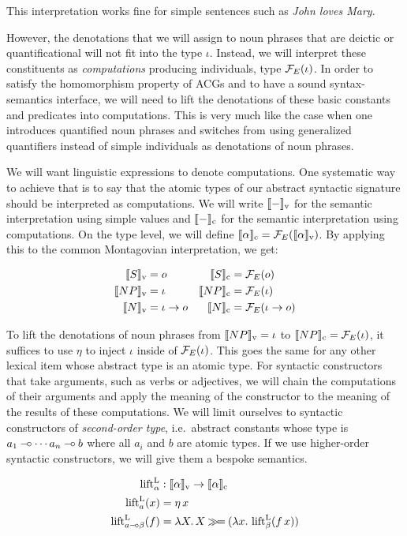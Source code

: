 This interpretation works fine for simple sentences such as \emph{John
  loves Mary}.

However, the denotations that we will assign to noun phrases that are
deictic or quantificational will not fit into the type $\iota$. Instead, we
will interpret these constituents as \emph{computations} producing
individuals, type $\mathcal{F}_E(\iota)$. In order to satisfy the homomorphism
property of ACGs and to have a sound syntax-semantics interface, we will
need to lift the denotations of these basic constants and predicates into
computations. This is very much like the case when one introduces
quantified noun phrases and switches from using generalized quantifiers
instead of simple individuals as denotations of noun phrases.

We will want linguistic expressions to denote computations. One systematic
way to achieve that is to say that the atomic types of our abstract
syntactic signature should be interpreted as computations. We will write
$\llbracket - \rrbracket_{\mathrm{v}}$ for the semantic interpretation using simple values and
$\llbracket - \rrbracket_{\mathrm{c}}$ for the semantic interpretation using computations. On
the type level, we will define
$\llbracket \alpha \rrbracket_{\mathrm{c}} = \mathcal{F}_E(\llbracket \alpha \rrbracket_{\mathrm{v}})$. By applying this to
the common Montagovian interpretation, we get:

\begin{align*}
  \llbracket S \rrbracket_{\mathrm{v}} &= o & \llbracket S \rrbracket_{\mathrm{c}} &= \mathcal{F}_E(o) \\
  \llbracket NP \rrbracket_{\mathrm{v}} &= \iota & \llbracket NP \rrbracket_{\mathrm{c}} &= \mathcal{F}_E(\iota) \\
  \llbracket N \rrbracket_{\mathrm{v}} &= \iota \to o & \llbracket N \rrbracket_{\mathrm{c}} &= \mathcal{F}_E(\iota \to o)
\end{align*}

To lift the denotations of noun phrases from $\llbracket NP \rrbracket_{\mathrm{v}} = \iota$ to
$\llbracket NP \rrbracket_{\mathrm{c}} = \mathcal{F}_E(\iota)$, it suffices to use $\eta$ to inject
$\iota$ inside of $\mathcal{F}_E(\iota)$. This goes the same for any other lexical
item whose abstract type is an atomic type. For syntactic constructors that
take arguments, such as verbs or adjectives, we will chain the computations
of their arguments and apply the meaning of the constructor to the meaning
of the results of these computations. We will limit ourselves to syntactic
constructors of \emph{second-order type}, i.e.\ abstract constants whose
type is $a_1 \mathbin{{-}\mkern-3.5mu{\circ}} \cdots a_n \mathbin{{-}\mkern-3.5mu{\circ}} b$ where all $a_i$ and $b$ are atomic
types. If we use higher-order syntactic constructors, we will give them a
bespoke semantics.

\begin{align*}
  \operatorname{lift}^{\mathrm{L}}_\alpha &: \llbracket \alpha \rrbracket_{\mathrm{v}} \to \llbracket \alpha \rrbracket_{\mathrm{c}} \\
  \operatorname{lift}^{\mathrm{L}}_a(x) &= \eta\,x \\
  \operatorname{lift}^{\mathrm{L}}_{a \mathbin{{-}\mkern-3.5mu{\circ}} \beta}(f) &= \lambda X.\, X \mathbin{\gg\!=} (\lambda x.\, \operatorname{lift}^{\mathrm{L}}_\beta(f\,x))
\end{align*}

